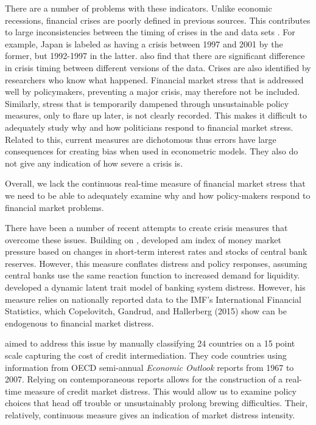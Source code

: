 \documentclass[]{article}
\begin{document}
There are a number of problems with these indicators. Unlike economic
recessions, financial crises are poorly defined in previous sources.
This contributes to large inconsistencies between the timing of crises
in the \cite{laeven2013} and \cite{Reinhart2009} data
sets \citep{Chaudron2014}. For example, Japan is labeled as having a
crisis between 1997 and 2001 by the former, but 1992-1997 in the latter.
\cite{GandrudHallerberg2015} also find that there are significant
difference in crisis timing between different versions of the \cite{laeven2013} data. Crises are also identified by researchers who know
what happened. Financial market stress that is addressed well by
policymakers, preventing a major crisis, may therefore not be included.
Similarly, stress that is temporarily dampened through unsustainable
policy measures, only to flare up later, is not clearly recorded. This
makes it difficult to adequately study why and how politicians respond
to financial market stress. Related to this, current measures are
dichotomous thus errors have large consequences for creating bias when
used in econometric models. They also do not give any indication of how
severe a crisis is.

Overall, we lack the continuous real-time measure of financial market
stress that we need to be able to adequately examine why and how
policy-makers respond to financial market problems.

There have been a number of recent attempts to create crisis measures
that overcome these issues. Building on \cite{vonHagen2007}, \cite{Jing2015} developed am index of money market pressure based on
changes in short-term interest rates and stocks of central bank
reserves. However, this measure conflates distress and policy responses,
assuming central banks use the same reaction function to increased
demand for liquidity. \cite{Rosas2009} developed a dynamic latent trait
model of banking system distress. However, his measure relies on
nationally reported data to the IMF's International Financial
Statistics, which Copelovitch, Gandrud, and Hallerberg (2015) show can
be endogenous to financial market distress.

\cite{Romer2015} aimed to address this issue by manually
classifying 24 countries on a 15 point scale capturing the cost of
credit intermediation. They code countries using information from OECD
semi-annual \emph{Economic Outlook} reports from 1967 to 2007. Relying
on contemporaneous reports allows for the construction of a real-time
measure of credit market distress. This would allow us to examine policy
choices that head off trouble or unsustainably prolong brewing
difficulties. Their, relatively, continuous measure gives an indication
of market distress intensity.
\end{document}
